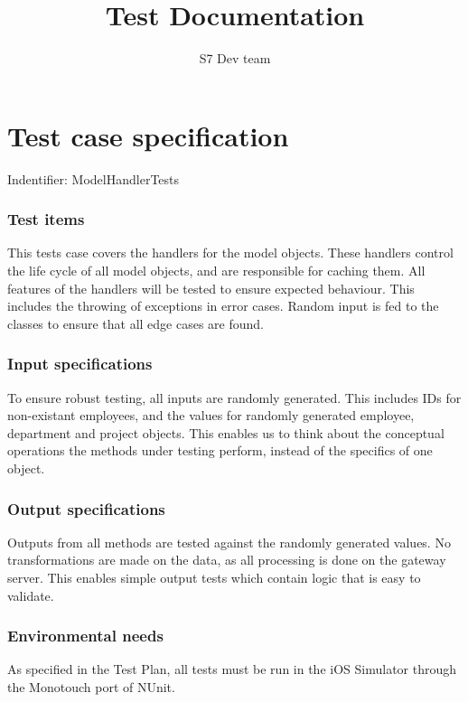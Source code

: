 \documentclass[11pt,a4paper]{article}
\title{Test Documentation}
\author{S7 Dev team}
\begin{document}
\maketitle

\part{Test case specification} %
\label{prt:Test_case_specification}

Indentifier: ModelHandlerTests

\section{Test items} %
\label{sec:Test_items}


This tests case covers the handlers for the model objects. These handlers
control the life cycle of all model objects, and are responsible for
caching them. All features of the handlers will be tested to ensure
expected behaviour. This includes the throwing of exceptions in error cases.
Random input is fed to the classes to ensure that all edge cases are found.


\section{Input specifications} %
\label{sec:Input_specifications}

To ensure robust testing, all inputs are randomly generated. This includes
IDs for non-existant employees, and the values for randomly generated
employee, department and project objects. This enables us to think about
the conceptual operations the methods under testing perform, instead of
the specifics of one object.


\section{Output specifications} %
\label{sec:Output_specifications}

Outputs from all methods are tested against the randomly generated values.
No transformations are made on the data, as all processing is done on the
gateway server. This enables simple output tests which contain logic that
is easy to validate.


\section{Environmental needs} %
\label{sec:Environmental_needs}

As specified in the Test Plan, all tests must be run in the iOS Simulator through the
Monotouch port of NUnit.


\end{document}
